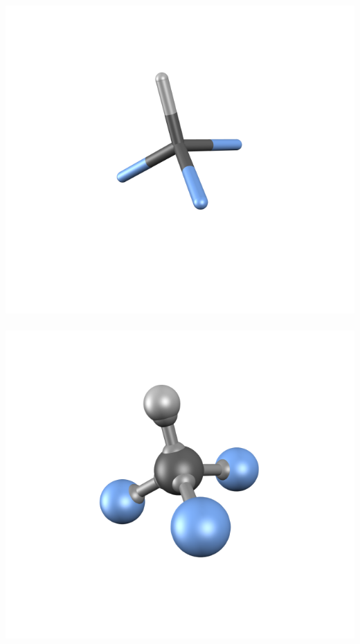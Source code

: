 \documentclass[a4paper,12pt]{article}
\begin{document}
\begin{center}
\includegraphics[scale=0.25]{figures/CHF3-tubes.png}\hspace{-15mm}~
\includegraphics[scale=0.25]{figures/CHF3-moly.png}\hspace{-15mm}~

\end{center}
\end{document}
